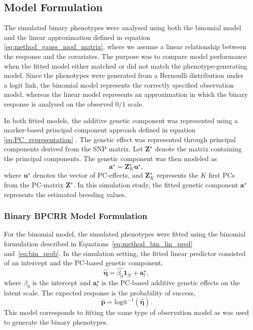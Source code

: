 \subsection{Model Formulation}

The simulated binary phenotypes were analysed using both the binomial model and the linear approximation defined in equation \eqref{eq:method_gauss_mod_matrix}, where we assume a linear relationship between the response and the covariates. The purpose was to compare model performance when the fitted model either matched or did not match the phenotype-generating model. Since the phenotypes were generated from a Bernoulli distribution under a logit link, the binomial model represents the correctly specified observation model, whereas the linear model represents an approximation in which the binary response is analysed on the observed $0/1$ scale.

In both fitted models, the additive genetic component was represented using a marker-based principal component approach defined in equation \eqref{eq:PC_representation} . The genetic effect was represented through principal components derived from the SNP matrix. Let $\mathbf{Z}^\star$ denote the matrix containing the principal components. The genetic component was then modeled as
%
\[
\mathbf{a^\star} = \mathbf{Z}^\star_{K}\boldsymbol{u}^\star,
\]
%
where $\boldsymbol{u}^\star$ denotes the vector of PC-effects, and $\mathbf{Z}_K^\star$ represents the $K$ first PCs from the PC-matrix $\mathbf{Z}^\star$. In this simulation study, the fitted genetic component $\mathbf{a^\star}$ represents the estimated breeding values.



\subsubsection*{Binary  BPCRR Model Formulation}

For the binomial model, the simulated phenotypes were fitted using the binomial formulation described in Equations~\eqref{eq:method_bin_lin_pred} and~\eqref{eq:bin_prob}. In the simulation setting, the fitted linear predictor consisted of an intercept and the PC-based genetic component,
%
\[
\hat{\boldsymbol{\eta}}= \hat{\beta_0} \mathbf{1}_N + \mathbf{a}^\star_l,
\]
%
where $\beta_0$ is the intercept and $\mathbf{a}^\star_l$ is the PC-based additive genetic effects on the latent scale. The expected response is the probability of success,
%
\[\hat{\mathbf{p}} = \mathrm{logit}^{-1}(\boldsymbol{\hat{\eta}}).
\]
%
This model corresponds to fitting the same type of observation model as was used to generate the binary phenotypes.

